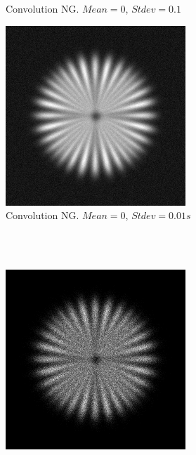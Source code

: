 \documentclass{./packages/optica-article}
\begin{document}
\begin{figure}[hbp]
\begin{center}
\begin{subfigure}[t]{0.25\textwidth}
			\caption{Convolution NG. $Mean=0$, $Stdev=0.1$}\label{fig:sim:ng0.1}
		\end{subfigure}
		\hfill
		\begin{subfigure}[t]{0.25\textwidth}\centering
			\centering
			\includegraphics[width=\textwidth]{Simulation deconvolution/ref_ng_0.01}
			\caption{Convolution NG. $Mean=0$, $Stdev=0.01s$}\label{fig:sim:ng0.01}
		\end{subfigure}
		\hfill\,
		\\
		\hfill\,
		\begin{subfigure}[t]{0.25\textwidth}\centering
			\centering
			\includegraphics[width=\textwidth]{Simulation deconvolution/ref_np_0.01}

\end{subfigure}
\end{center}
\end{figure}
\end{document}
